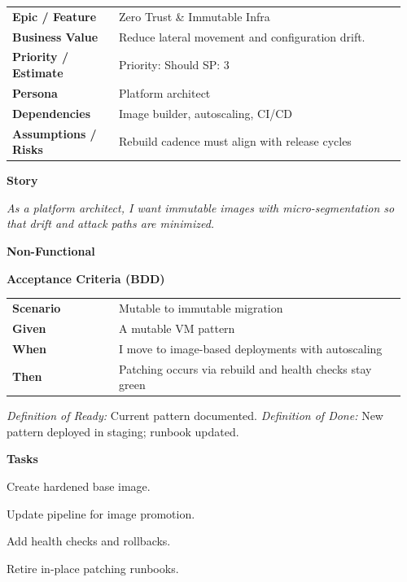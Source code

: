 \documentclass[11pt,letterpaper]{article}
\makeatletter
\newenvironment{kvtable}{%
  \par\noindent\begin{tabular}{@{}>{\raggedright\bfseries\arraybackslash}p{0.26\linewidth} >{\raggedright\arraybackslash}p{0.70\linewidth}@{}}
}{\end{tabular}\par}
\newenvironment{bdd}{%
  \par\noindent\begin{tabular}{@{}>{\raggedright\bfseries\arraybackslash}p{0.26\linewidth} >{\raggedright\arraybackslash}p{0.70\linewidth}@{}}
}{\end{tabular}\par}
\newcommand{\DoRDoD}[2]{%
  \vspace{0.35em}
  {\footnotesize\color{Muted}%
    \textit{Definition of Ready:} #1 \; \textbullet\;
    \textit{Definition of Done:} #2%
  }%
}
\newenvironment{storycard}[2]{%
  \begin{tcolorbox}[cloudcard, title={#1 --- #2}]%
}{\end{tcolorbox}}
\newcommand{\sectionlabel}[1]{\par\vspace{0.35em}\textbf{#1}\par}
\makeatother
\begin{document}
\begin{storycard}{CCS-15}{Ch. 15 — Architecture \& Security Concepts}
\begin{kvtable}
Epic / Feature & Zero Trust \& Immutable Infra\\
Business Value & Reduce lateral movement and configuration drift.\\
Priority / Estimate & Priority: Should \quad SP: 3\\
Persona & Platform architect\\
Dependencies & Image builder, autoscaling, CI/CD\\
Assumptions / Risks & Rebuild cadence must align with release cycles\\
\end{kvtable}
\sectionlabel{Story}
\textit{As a platform architect, I want immutable images with micro-segmentation so that drift and attack paths are minimized.}
\sectionlabel{Non-Functional}\;
\sectionlabel{Acceptance Criteria (BDD)}
\begin{bdd}
Scenario & Mutable to immutable migration\\
Given & A mutable VM pattern\\
When & I move to image-based deployments with autoscaling\\
Then & Patching occurs via rebuild and health checks stay green\\
\end{bdd}
\DoRDoD{Current pattern documented.}{New pattern deployed in staging; runbook updated.}
\sectionlabel{Tasks}
\begin{checklist}
\item Create hardened base image.
\item Update pipeline for image promotion.
\item Add health checks and rollbacks.
\item Retire in-place patching runbooks.
\end{checklist}
\end{storycard}
\end{document}
